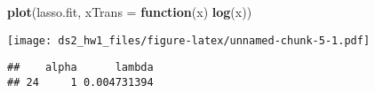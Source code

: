 \documentclass[]{article}
\newenvironment{Shaded}{\begin{snugshade}}{\end{snugshade}}
\newcommand{\CommentTok}[1]{\textcolor[rgb]{0.56,0.35,0.01}{\textit{#1}}}
\newcommand{\ControlFlowTok}[1]{\textcolor[rgb]{0.13,0.29,0.53}{\textbf{#1}}}
\newcommand{\DataTypeTok}[1]{\textcolor[rgb]{0.13,0.29,0.53}{#1}}
\newcommand{\KeywordTok}[1]{\textcolor[rgb]{0.13,0.29,0.53}{\textbf{#1}}}
\newcommand{\NormalTok}[1]{#1}
\newcommand{\OperatorTok}[1]{\textcolor[rgb]{0.81,0.36,0.00}{\textbf{#1}}}
\begin{document}
\begin{Shaded}
\begin{Highlighting}[]
\KeywordTok{plot}\NormalTok{(lasso.fit, }\DataTypeTok{xTrans =} \ControlFlowTok{function}\NormalTok{(x) }\KeywordTok{log}\NormalTok{(x))}
\end{Highlighting}
\end{Shaded}

\texttt{[image: ds2\_hw1\_files/figure-latex/unnamed-chunk-5-1.pdf]}

\begin{Shaded}
\end{Shaded}

\begin{verbatim}
##    alpha      lambda
## 24     1 0.004731394
\end{verbatim}

\begin{Shaded}
\end{Shaded}
\end{document}

